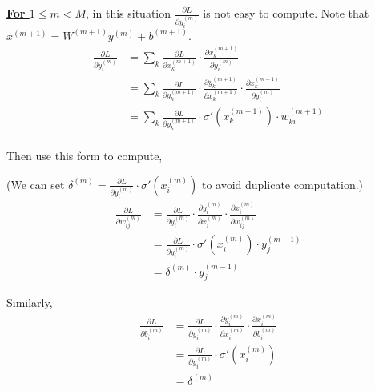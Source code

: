 \documentclass[11pt,a4paper]{article}
\begin{document}
\textbf{\underline{For $1\leq m< M$}}, in this situation $\frac{\partial L}{\partial y_i^{(m)}}$ is not easy to compute. Note that $x^{(m+1)}=W^{(m+1)}y^{(m)}+b^{(m+1)}$.
\begin{equation}
    \begin{aligned}
    \frac{\partial L}{\partial y_i^{(m)}}&=\sum_k \frac{\partial L}{\partial x_{k}^{(m+1)}}\cdot \frac{\partial x_{k}^{(m+1)}}{\partial y_i^{(m)}}\\
    &=\sum_k \frac{\partial L}{\partial y_{k}^{(m+1)}}\cdot\frac{\partial y_{k}^{(m+1)}}{\partial x_{k}^{(m+1)}}\cdot \frac{\partial x_{k}^{(m+1)}}{\partial y_i^{(m)}}\\
    &=\sum_k \frac{\partial L}{\partial y_{k}^{(m+1)}}\cdot\sigma'(x_k^{(m+1)})\cdot w_{ki}^{(m+1)}\\
    \end{aligned}
    \nonumber
\end{equation}

Then use this form to compute,

(We can set $\delta^{(m)}=\frac{\partial L}{\partial y_i^{(m)}}\cdot \sigma'(x_{i}^{(m)})$ to avoid duplicate computation.)
\begin{equation}
    \begin{aligned}
        \frac{\partial L}{\partial w_{ij}^{(m)}}&=\frac{\partial L}{\partial y_i^{(m)}}\cdot \frac{\partial y_i^{(m)}}{\partial x_{i}^{(m)}}\cdot \frac{\partial x_{i}^{(m)}}{\partial w_{ij}^{(m)}}\\
        &=\frac{\partial L}{\partial y_i^{(m)}}\cdot \sigma'(x_{i}^{(m)}) \cdot y_j^{(m-1)}\\
        &=\delta^{(m)}\cdot y_j^{(m-1)}
    \end{aligned}
    \nonumber
\end{equation}

Similarly,
\begin{equation}
    \begin{aligned}
        \frac{\partial L}{\partial b_{i}^{(m)}}&=\frac{\partial L}{\partial y_i^{(m)}}\cdot \frac{\partial y_i^{(m)}}{\partial x_{i}^{(m)}}\cdot \frac{\partial x_{i}^{(m)}}{\partial b_{i}^{(m)}}\\
        &=\frac{\partial L}{\partial y_i^{(m)}}\cdot \sigma'(x_{i}^{(m)})\\
        &=\delta^{(m)}
    \end{aligned}
    \nonumber
\end{equation}
\end{document}
